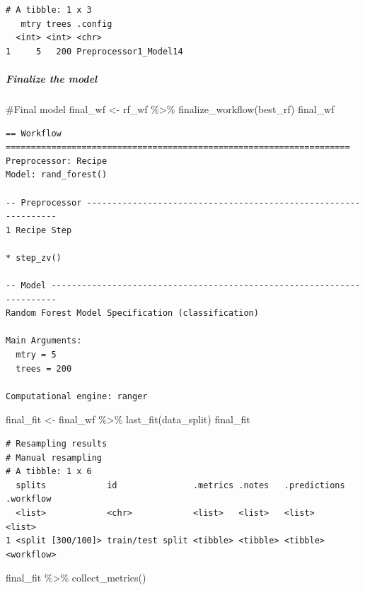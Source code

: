 \documentclass[
]{article}
\let\oldsubparagraph\subparagraph
\renewcommand{\subparagraph}[1]{\oldsubparagraph{#1}\mbox{}}
\newenvironment{Shaded}{\begin{snugshade}}{\end{snugshade}}
\newcommand{\CommentTok}[1]{\textcolor[rgb]{0.37,0.37,0.37}{#1}}
\newcommand{\FunctionTok}[1]{\textcolor[rgb]{0.28,0.35,0.67}{#1}}
\newcommand{\NormalTok}[1]{\textcolor[rgb]{0.00,0.23,0.31}{#1}}
\newcommand{\OtherTok}[1]{\textcolor[rgb]{0.00,0.23,0.31}{#1}}
\newcommand{\SpecialCharTok}[1]{\textcolor[rgb]{0.37,0.37,0.37}{#1}}
\begin{document}
\begin{verbatim}
# A tibble: 1 x 3
   mtry trees .config              
  <int> <int> <chr>                
1     5   200 Preprocessor1_Model14
\end{verbatim}

\hypertarget{finalize-the-model-3}{%
\subparagraph{Finalize the model}\label{finalize-the-model-3}}

\begin{Shaded}
\begin{Highlighting}[]
\CommentTok{\#Final model}
\NormalTok{final\_wf }\OtherTok{\textless{}{-}}\NormalTok{ rf\_wf }\SpecialCharTok{\%\textgreater{}\%}
  \FunctionTok{finalize\_workflow}\NormalTok{(best\_rf)}
\NormalTok{final\_wf}
\end{Highlighting}
\end{Shaded}

\begin{verbatim}
== Workflow ====================================================================
Preprocessor: Recipe
Model: rand_forest()

-- Preprocessor ----------------------------------------------------------------
1 Recipe Step

* step_zv()

-- Model -----------------------------------------------------------------------
Random Forest Model Specification (classification)

Main Arguments:
  mtry = 5
  trees = 200

Computational engine: ranger 
\end{verbatim}

\begin{Shaded}
\begin{Highlighting}[]
\NormalTok{final\_fit }\OtherTok{\textless{}{-}} 
\NormalTok{  final\_wf }\SpecialCharTok{\%\textgreater{}\%}
  \FunctionTok{last\_fit}\NormalTok{(data\_split)}
\NormalTok{final\_fit}
\end{Highlighting}
\end{Shaded}

\begin{verbatim}
# Resampling results
# Manual resampling 
# A tibble: 1 x 6
  splits            id               .metrics .notes   .predictions .workflow 
  <list>            <chr>            <list>   <list>   <list>       <list>    
1 <split [300/100]> train/test split <tibble> <tibble> <tibble>     <workflow>
\end{verbatim}

\begin{Shaded}
\begin{Highlighting}[]
\NormalTok{final\_fit }\SpecialCharTok{\%\textgreater{}\%} 
  \FunctionTok{collect\_metrics}\NormalTok{()}
\end{Highlighting}
\end{Shaded}
\end{document}
